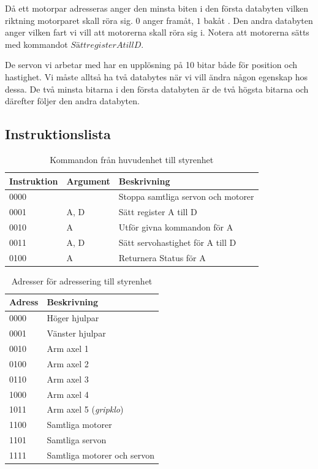 Då ett motorpar adresseras anger den minsta biten i den första databyten vilken riktning motorparet skall röra sig. $0$ anger framåt, $1$ bakåt . Den andra databyten anger vilken fart vi vill att motorerna skall röra sig i. Notera att motorerna sätts med kommandot $Sätt register A till D$.

De servon vi arbetar med har en upplösning på 10 bitar både för position och hastighet. Vi måste alltså ha två databytes när vi vill ändra någon egenskap hos dessa. De två minsta bitarna i den första databyten är de två högsta bitarna och därefter följer den andra databyten.


\subsection{Instruktionslista}

\begin{table}[h!]
	\centering
	\begin{tabularx}{\textwidth}{| l | l | X |}
		\hline
		\textbf{Instruktion} & \textbf{Argument} & \textbf{Beskrivning} \\\hline
		{0000} & {} & {Stoppa samtliga servon och motorer \todo{Behöver implementeras}} \\\hline
		{0001} & {A, D} & {Sätt register A till D} \\\hline
		{0010} & {A} & {Utför givna kommandon för A} \\\hline
		{0011} & {A, D} & {Sätt servohastighet för A till D} \\\hline
		{0100} & {A} & {Returnera Status för A \todo{Implementera?}} \\\hline
	\end{tabularx}
	\caption{Kommandon från huvudenhet till styrenhet } \label{protokoll:pc-motor-tabell}
\end{table}

\begin{table}[h!]
	\centering
	\begin{tabularx}{\textwidth}{| l | X |}
		\hline
		\textbf{Adress} & \textbf{Beskrivning} \\\hline
		{0000} & {Höger hjulpar} \\\hline
		{0001} & {Vänster hjulpar} \\\hline
		{0010} & {Arm axel 1} \\\hline
		{0100} & {Arm axel 2} \\\hline
		{0110} & {Arm axel 3} \\\hline
		{1000} & {Arm axel 4} \\\hline
		{1011} & {Arm axel 5 (\textit{gripklo})} \\\hline
		{1100} & {Samtliga motorer} \\\hline
		{1101} & {Samtliga servon} \\\hline
		{1111} & {Samtliga motorer och servon} \\\hline
	\end{tabularx}
	\caption{Adresser för adressering till styrenhet} \label{protokoll:pc-motor-adress-tabell}
\end{table}

